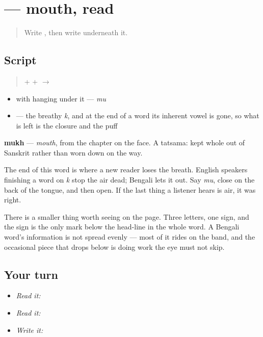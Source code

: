 \section[\texorpdfstring{\bn{মুখ} (mukh)}{মুখ (mukh)}]{ — mouth, read}

\label{lesson:BN-W03-mukh-read}



\begin{quote}
Write \textbf{}, then write \textbf{} underneath it.
\end{quote}

\subsection*{Script}
\begin{quote}
\textbf{} + \textbf{} + \textbf{} $\to$ \textbf{}
\end{quote}

\begin{itemize}
\raggedright
  \item \textbf{} with \textbf{} hanging under it — \emph{mu}
  \item \textbf{} — the breathy \emph{k}, and at the end of a word its inherent vowel is gone, so what is left is the closure and the puff
\end{itemize}

\textbf{mukh} — \emph{mouth}, from the chapter on the face. A tatsama: kept whole out of Sanskrit rather than worn down on the way.

The end of this word is where a new reader loses the breath. English speakers finishing a word on \emph{k} stop the air dead; Bengali lets it out. Say \emph{mu}, close on the back of the tongue, and then open. If the last thing a listener hears is air, it was right.

There is a smaller thing worth seeing on the page. Three letters, one sign, and the sign is the only mark below the head-line in the whole word. A Bengali word's information is not spread evenly — most of it rides on the band, and the occasional piece that drops below is doing work the eye must not skip.

\subsection*{Your turn}
\begin{itemize}
\raggedright
  \item \emph{Read it:} 
  \item \emph{Read it:} 
  \item \emph{Write it:} 
\end{itemize}

